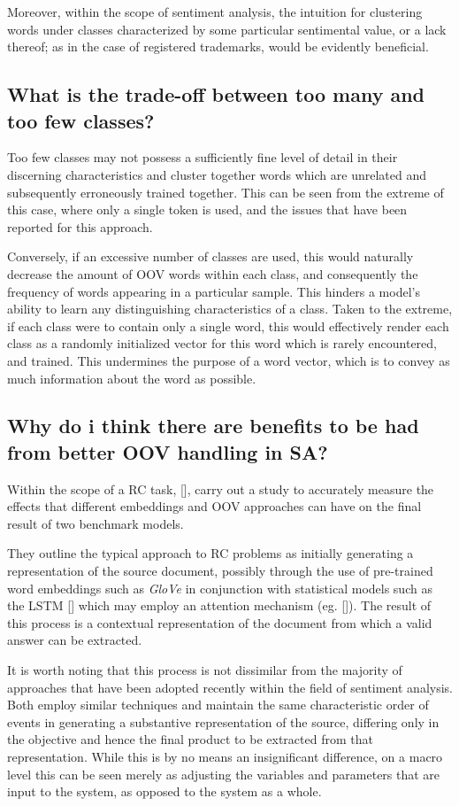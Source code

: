 \documentclass[12pt, a4paper]{report}
\theoremstyle{definition}
\theoremstyle{definition}%
\theoremstyle{definition}%
\theoremstyle{definition}%
\theoremstyle{definition}%
\theoremstyle{definition}%
\renewcommand{\cite}[1]{[\citealp{#1}]}
\begin{document}
Moreover, within the scope of sentiment analysis, the intuition for clustering words under classes characterized by some particular sentimental value, or a lack thereof; as in the case of registered trademarks, would be evidently beneficial.

\subsection{What is the trade-off between too many and too few classes?}
Too few classes may not possess a sufficiently fine level of detail in their discerning characteristics and cluster together words which are unrelated and subsequently erroneously trained together. This can be seen from the extreme of this case, where only a single token is used, and the issues that have been reported for this approach.

Conversely, if an excessive number of classes are used, this would naturally decrease the amount of OOV words within each class, and consequently the frequency of words appearing in a particular sample. This hinders a model's ability to learn any distinguishing characteristics of a class. Taken to the extreme, if each class were to contain only a single word, this would effectively render each class as a randomly initialized vector for this word which is rarely encountered, and trained. This undermines the purpose of a word vector, which is to convey as much information about the word as possible.

\subsection{Why do i think there are benefits to be had from better OOV handling in SA?}
Within the scope of a RC task, \cite{bhuwandhingra2017}, carry out a study to accurately measure the effects that different embeddings and OOV approaches can have on the final result of two benchmark models.

They outline the typical approach to RC problems as initially generating a representation of the source document, possibly through the use of pre-trained word embeddings such as \textit{GloVe} in conjunction with statistical models such as the LSTM \cite{hochreiter1997} which may employ an attention mechanism (eg. \cite{bahdanau2014}). The result of this process is a contextual representation of the document from which a valid answer can be extracted.

It is worth noting that this process is not dissimilar from the majority of approaches that have been adopted recently within the field of sentiment analysis. Both employ similar techniques and maintain the same characteristic order of events in generating a substantive representation of the source, differing only in the objective and hence the final product to be extracted from that representation. While this is by no means an insignificant difference, on a macro level this can be seen merely as adjusting the variables and parameters that are input to the system, as opposed to the system as a whole.
\end{document}
